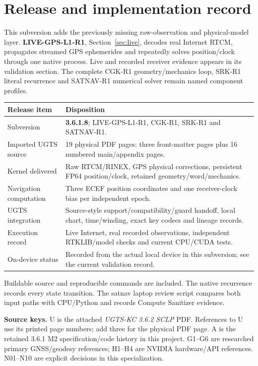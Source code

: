 \documentclass[11pt,a4paper]{article}
\begin{document}
\section*{Release and implementation record}
This subversion adds the previously missing raw-observation and physical-model
layer. \textbf{LIVE-GPS-L1-R1}, Section~\ref{sec:live}, decodes real Internet RTCM,
propagates streamed GPS ephemerides and repeatedly solves position/clock through
one native process. Live and recorded receiver evidence appears in its validation
section. The complete CGK-R1 geometry/mechanics loop, SRK-R1 literal recurrence
and SATNAV-R1 numerical solver remain named component profiles.

\begin{center}
\begin{tabularx}{\textwidth}{@{}P{.30\textwidth}Y@{}}\toprule
\textbf{Release item} & \textbf{Disposition}\\\midrule
Subversion & \textbf{3.6.1.8}; LIVE-GPS-L1-R1, CGK-R1, SRK-R1 and SATNAV-R1.\\
Imported UGTS source & 19 physical PDF pages: three front-matter pages plus 16 numbered main/appendix pages.\\
Kernel delivered & Raw RTCM/RINEX, GPS physical corrections, persistent FP64 position/clock, retained geometry/word/mechanics.\\
Navigation computation & Three ECEF position coordinates and one receiver-clock bias per independent epoch.\\
UGTS integration & Source-style support/compatibility/guard handoff, local chart, time/winding, exact key codecs and lineage records.\\
Execution record & Live Internet, real recorded observations, independent RTKLIB/model checks and current CPU/CUDA tests.\\
On-device status & Recorded from the actual local device in this subversion; see the current validation record.\\\bottomrule
\end{tabularx}
\end{center}

Buildable source and reproducible commands are included. The native recurrence
records every state transition. The satnav laptop review script compares both
input paths with CPU/Python and records Compute Sanitizer evidence.

\textbf{Source keys.} U is the attached \emph{UGTS-KC 3.6.2 SCLP} PDF. References to U
use its printed page numbers; add three for the physical PDF page. A is the retained
3.6.1 M2 specification/code history in this project. G1--G6 are researched primary
GNSS/geodesy references; H1--H4 are NVIDIA hardware/API references. N01--N10 are
explicit decisions in this specialization.
\end{document}
